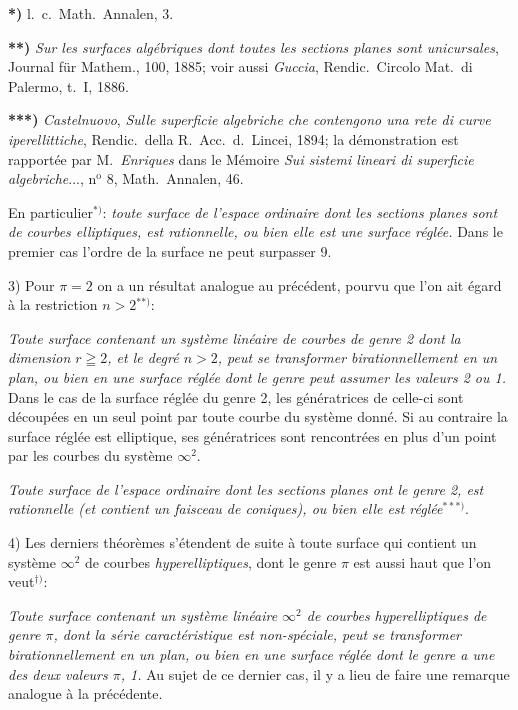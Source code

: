 \documentclass{article}
\begin{document}
\textbf{*)} l.\ c.\ Math.\ Annalen, 3.

\textbf{**)} \emph{Sur les surfaces algébriques dont toutes les sections planes sont unicursales}, Journal für Mathem., 100, 1885; voir aussi \emph{Guccia}, Rendic.\ Circolo Mat.\ di Palermo, t.\ I, 1886.

\textbf{***)} \emph{Castelnuovo}, \emph{Sulle superficie algebriche che contengono una rete di curve iperellittiche}, Rendic.\ della R.\ Acc.\ d.\ Lincei, 1894; la démonstration est rapportée par M.\ \emph{Enriques} dans le Mémoire \emph{Sui sistemi lineari di superficie algebriche}..., n${}^{\text{o}}$ 8, Math.\ Annalen, 46.


En particulier${}^{*)}$: \emph{toute surface de l'espace ordinaire dont les sections planes sont de courbes elliptiques, est rationnelle, ou bien elle est une surface réglée.} Dans le premier cas l'ordre de la surface ne peut surpasser 9.

3) Pour $\pi = 2$ on a un résultat analogue au précédent, pourvu que l'on ait égard à la restriction $n > 2$${}^{**)}$:

\emph{Toute surface contenant un système linéaire de courbes de genre 2 dont la dimension $r \geqq 2$, et le degré $n > 2$, peut se transformer birationnellement en un plan, ou bien en une surface réglée dont le genre peut assumer les valeurs 2 ou 1.} Dans le cas de la surface réglée du genre 2, les génératrices de celle-ci sont découpées en un seul point par toute courbe du système donné. Si au contraire la surface réglée est elliptique, ses génératrices sont rencontrées en plus d'un point par les courbes du système $\infty^{2}$.

\emph{Toute surface de l'espace ordinaire dont les sections planes ont le genre 2, est rationnelle (et contient un faisceau de coniques), ou bien elle est réglée}${}^{***)}$.

4) Les derniers théorèmes s'étendent de suite à toute surface qui contient un système $\infty^{2}$ de courbes \emph{hyperelliptiques}, dont le genre $\pi$ est aussi haut que l'on veut${}^{\dagger)}$:

\emph{Toute surface contenant un système linéaire $\infty^{2}$ de courbes hyperelliptiques de genre $\pi$, dont la série caractéristique est non-spéciale, peut se transformer birationnellement en un plan, ou bien en une surface réglée dont le genre a une des deux valeurs $\pi$, 1.} Au sujet de ce dernier cas, il y a lieu de faire une remarque analogue à la précédente.
\end{document}
